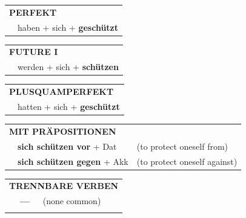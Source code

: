 \documentclass[10pt,a4paper]{revtex4-2}
\begin{document}
\begin{verbbox}
 \begin{tabular}{rl}
     \multicolumn{2}{l}{\textbf{PERFEKT}}\\
   & haben + sich + \textbf{geschützt}\\
  \end{tabular}
\hfill
   \begin{tabular}{rl}
    \multicolumn{2}{l}{\textbf{FUTURE I} }\\
   & werden + sich + \textbf{schützen}\\
  \end{tabular}
\hfill
   \begin{tabular}{rl}
      \multicolumn{2}{l}{\textbf{PLUSQUAMPERFEKT}}\\
   & hatten + sich + \textbf{geschützt}\\
  \end{tabular}

   \vspace{10pt}

   \begin{tabular}{lll}
      \multicolumn{3}{l}{\textbf{MIT PRÄPOSITIONEN}}\\
& \textbf{sich schützen vor} + Dat & (to protect oneself from)\\
& \textbf{sich schützen gegen} + Akk & (to protect oneself against)\\
\end{tabular}
  \hfill
   \begin{tabular}{lll}
      \multicolumn{3}{l}{\textbf{TRENNBARE VERBEN}}\\
 & \textbf{---} & (none common)\\
\vspace{10pt}
  \end{tabular}

  \vspace{-5pt}

\end{verbbox}
\end{document}
